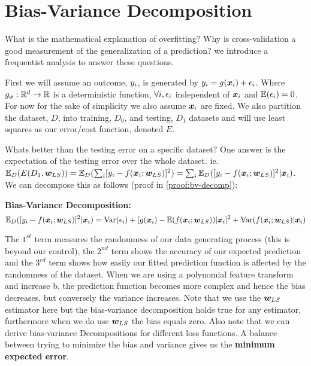 \section{Bias-Variance Decomposition}
What is the mathematical explanation of overfitting? Why is cross-validation a good measurement of the generalization of a prediction? we introduce a frequentist analysis to answer these questions. 

First we will assume an outcome, $y_{i}$, is generated by $y_{i} = g(\bm{x}_{i}) +\epsilon_{i}$. Where $g_{\bm{x}} : \mathbb{R}^{d} \rightarrow \mathbb{R}$ is a deterministic function, $\forall i, \epsilon_{i}$ independent of $\bm{x}_{i}$ and $\mathbb{E}(\epsilon_{i})=0$. For now for the sake of simplicity we also assume $\bm{x}_{i}$ are fixed. We also partition the dataset, $D$, into training, $D_{0}$, and testing, $D_{1}$ datasets and will use least squares as our error/cost function, denoted $E$.

Whats better than the testing error on a specific dataset? One answer is the expectation of the testing error over the whole dataset. ie. $\mathbb{E}_{D}(E(D_{1}, \bm{w}_{LS})) = \mathbb{E}_{D}( \sum_{i} [y_{i} - f(\bm{x}_{i} ; \bm{w}_{LS})]^{2} ) = \sum_{i} \mathbb{E}_{D}([y_{i} - f(\bm{x}_{i} ; \bm{w}_{LS})]^{2} | \bm{x}_{i})$. We can decompose this as follows (proof in \cref{proof:bv-decomp}):
\begin{definition} \label{definition:bv-decomp}
    \textbf{Bias-Variance Decomposition:}
    \begin{equation}
        \mathbb{E}_{D}([y_{i} - f(\bm{x}_{i} ; \bm{w}_{LS})]^{2} | \bm{x}_{i}) = \text{Var}(\epsilon_{i}) + [g(\bm{x}_{i}) - \mathbb{E}(f(\bm{x}_{i} ; \bm{w}_{LS})) | \bm{x}_{i}]^{2} + \text{Var}(f(\bm{x}_{i} ; \bm{w}_{LS}) | \bm{x}_{i})
    \end{equation}
\end{definition}
The $1^{st}$ term measures the randomness of our data generating process (this is beyond our control), the $2^{nd}$ term shows the accuracy of our expected prediction and the $3^{rd}$ term shows how easily our fitted prediction function is affected by the randomness of the dataset. When we are using a polynomial feature transform and increase b, the prediction function becomes more complex and hence the bias decreases, but conversely the variance increases. Note that we use the $\bm{w}_{LS}$ estimator here but the bias-variance decomposition holds true for any estimator, furthermore when we do use $\bm{w}_{LS}$ the bias equals zero. Also note that we can derive bias-variance Decompositions for different loss functions. A balance between trying to minimize the bias and variance gives us the \textbf{minimum expected error}.  

